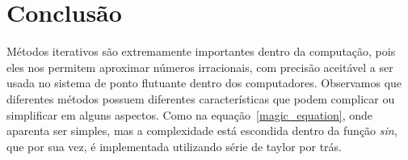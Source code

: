 \section{Conclusão}

Métodos iterativos são extremamente importantes dentro da computação, pois eles
nos permitem aproximar números irracionais, com precisão aceitável a ser usada
no sistema de ponto flutuante dentro dos computadores. Observamos que diferentes
métodos possuem diferentes características que podem complicar ou simplificar em
alguns aspectos. Como na equação~\ref{magic_equation}, onde aparenta ser
simples, mas a complexidade está escondida dentro da função \emph{sin}, que por
sua vez, é implementada utilizando série de taylor por trás.
